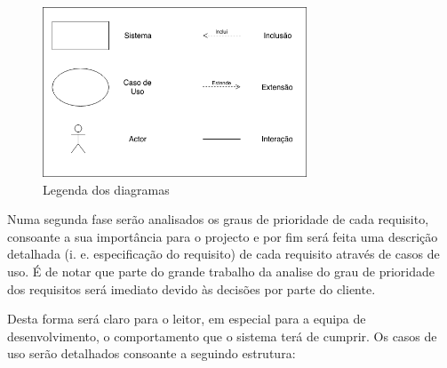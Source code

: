 \begin{figure}[ht!]
	\begin{center}
		\includegraphics[width=0.7\textwidth]{img/rf/legenda}
		\caption{Legenda dos diagramas}
		\label{fig:rf-legenda}
	\end{center}
\end{figure}

Numa segunda fase serão analisados os graus de prioridade de cada requisito, consoante a sua importância para o projecto e por fim será feita uma descrição detalhada (i. e. especificação do requisito) de cada requisito através de casos de uso. É de notar que parte do grande trabalho da analise do grau de prioridade dos requisitos será imediato devido às decisões por parte do cliente.

Desta forma será claro para o leitor, em especial para a equipa de desenvolvimento, o comportamento que o sistema terá de cumprir. Os casos de uso serão detalhados consoante a seguindo estrutura:

